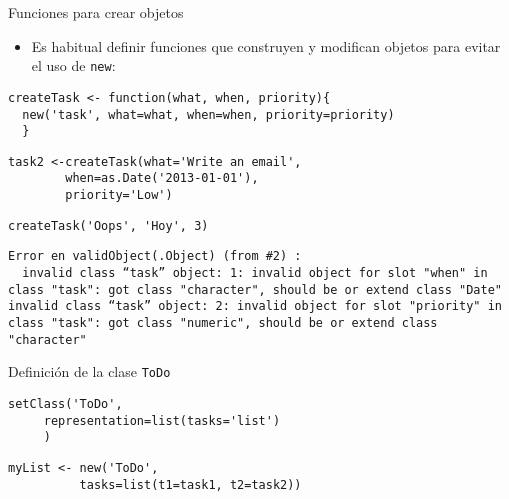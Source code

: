 \documentclass[xcolor={usenames,svgnames,dvipsnames}]{beamer}
\begin{document}
\begin{frame}[fragile,label=sec-3-1-4]{Funciones para crear objetos}
 \begin{itemize}
\item Es habitual definir funciones que construyen y modifican objetos
para evitar el uso de \texttt{new}:
\end{itemize}
\lstset{language=R,numbers=none}
\begin{lstlisting}
createTask <- function(what, when, priority){
  new('task', what=what, when=when, priority=priority)
  }
\end{lstlisting}

\lstset{language=R,numbers=none}
\begin{lstlisting}
task2 <-createTask(what='Write an email',
		when=as.Date('2013-01-01'),
		priority='Low')
\end{lstlisting}

\lstset{language=R,numbers=none}
\begin{lstlisting}
createTask('Oops', 'Hoy', 3)
\end{lstlisting}

\begin{verbatim}
Error en validObject(.Object) (from #2) : 
  invalid class “task” object: 1: invalid object for slot "when" in class "task": got class "character", should be or extend class "Date"
invalid class “task” object: 2: invalid object for slot "priority" in class "task": got class "numeric", should be or extend class "character"
\end{verbatim}
\end{frame}
\begin{frame}[fragile,label=sec-3-1-5]{Definición de la clase \texttt{ToDo}}
 \lstset{language=R,numbers=none}
\begin{lstlisting}
setClass('ToDo',
	 representation=list(tasks='list')
	 )
\end{lstlisting}

\lstset{language=R,numbers=none}
\begin{lstlisting}
myList <- new('ToDo',
	      tasks=list(t1=task1, t2=task2))
\end{lstlisting}
\end{frame}
\end{document}
